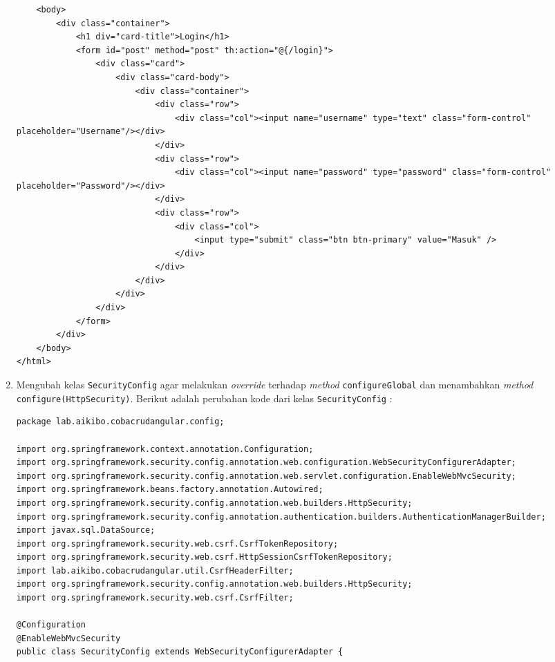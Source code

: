 \begin{enumerate}
\begin{lstlisting}
    <body>
        <div class="container">
        	<h1 div="card-title">Login</h1>
        	<form id="post" method="post" th:action="@{/login}">
        		<div class="card">
           			<div class="card-body">
               			<div class="container">
                   			<div class="row">
                       			<div class="col"><input name="username" type="text" class="form-control" placeholder="Username"/></div>
                   			</div>
                   			<div class="row">
                       			<div class="col"><input name="password" type="password" class="form-control" placeholder="Password"/></div>
                   			</div>
                   			<div class="row">
                       			<div class="col">
                           			<input type="submit" class="btn btn-primary" value="Masuk" />
                       			</div>
                   			</div>
               			</div>
           			</div>
       			</div>
       		</form>
    	</div>
    </body>
</html>
	\end{lstlisting}
	
	\item Mengubah kelas \texttt{SecurityConfig} agar melakukan \textit{override} terhadap \textit{method} \texttt{configureGlobal} dan menambahkan \textit{method} \texttt{configure(HttpSecurity)}. Berikut adalah perubahan kode dari kelas \texttt{SecurityConfig} :
	
	\begin{lstlisting}
package lab.aikibo.cobacrudangular.config;

import org.springframework.context.annotation.Configuration;
import org.springframework.security.config.annotation.web.configuration.WebSecurityConfigurerAdapter;
import org.springframework.security.config.annotation.web.servlet.configuration.EnableWebMvcSecurity;
import org.springframework.beans.factory.annotation.Autowired; 
import org.springframework.security.config.annotation.web.builders.HttpSecurity;
import org.springframework.security.config.annotation.authentication.builders.AuthenticationManagerBuilder;
import javax.sql.DataSource;
import org.springframework.security.web.csrf.CsrfTokenRepository;
import org.springframework.security.web.csrf.HttpSessionCsrfTokenRepository;
import lab.aikibo.cobacrudangular.util.CsrfHeaderFilter;
import org.springframework.security.config.annotation.web.builders.HttpSecurity;
import org.springframework.security.web.csrf.CsrfFilter;

@Configuration
@EnableWebMvcSecurity
public class SecurityConfig extends WebSecurityConfigurerAdapter {


\end{lstlisting}
\end{enumerate}
